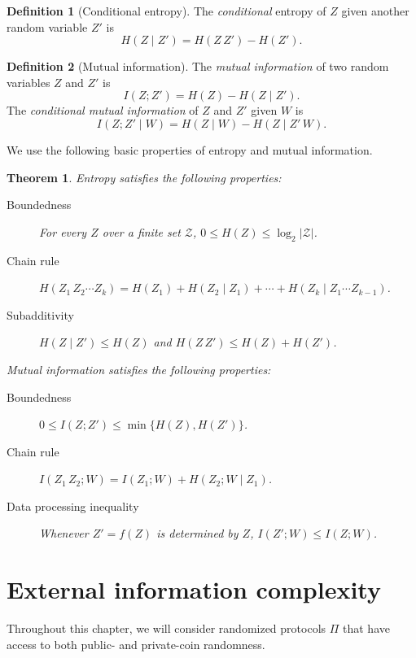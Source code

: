 \documentclass[11pt,oneside]{book}
\theoremstyle{plain}
\newtheorem{theorem}{Theorem}
\theoremstyle{definition}
\newtheorem{definition}{Definition}
\theoremstyle{plain}
\newcommand{\calZ}{\mathcal{Z}}
\begin{document}
\begin{definition}[Conditional entropy]
	The \emph{conditional} entropy of $Z$ given another random variable $Z'$ is
	\[
	H(Z \mid Z') = H(Z\,Z') - H(Z').
	\]
\end{definition}

\begin{definition}[Mutual information]
	The \emph{mutual information} of two random variables $Z$ and $Z'$ is
	\[
	I( Z ; Z' ) = H(Z) - H(Z \mid Z').
	\]
	The \emph{conditional mutual information} of $Z$ and $Z'$ given $W$ is
	\[
	I( Z ; Z' \mid W) = H(Z \mid W) - H(Z \mid Z'\, W).
	\]
\end{definition}

We use the following basic properties of entropy and mutual information.

\begin{theorem}
	Entropy satisfies the following properties:
	\begin{description}
		\item[Boundedness] For every $Z$ over a finite set $\calZ$, $0 \le H(Z) \le \log_2 |\calZ|$.
		\item[Chain rule] $H(Z_1\,Z_2\cdots Z_k) = H(Z_1) + H(Z_2 \mid Z_1) + \cdots + H(Z_k \mid Z_1\cdots Z_{k-1})$.
		\item[Subadditivity] $H(Z \mid Z') \le H(Z)$ and $H(Z\,Z') \le H(Z) + H(Z')$.
	\end{description}
	Mutual information satisfies the following properties:
	\begin{description}
		\item[Boundedness] $0 \le I(Z ; Z') \le \min\{ H(Z), H(Z') \}$.
		\item[Chain rule] $I(Z_1\,Z_2 ; W) = I(Z_1 ; W) + H(Z_2 ; W \mid Z_1)$.
		\item[Data processing inequality] Whenever $Z' = f(Z)$ is determined by $Z$, $I(Z' ; W) \le I(Z ; W)$.
	\end{description}
	
\end{theorem}



 
\section{External information complexity}

Throughout this chapter, we will consider randomized protocols $\Pi$ that have access to both public- and private-coin randomness. 
\end{document}
